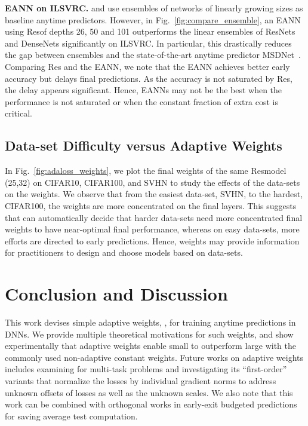 \textbf{EANN on ILSVRC.}
\cite{msdense} and \cite{feedbacknet} use ensembles of networks of linearly growing sizes as baseline anytime predictors. However, in Fig.~\ref{fig:compare_ensemble}, an EANN using Res\anns of depths 26, 50 and 101 outperforms the linear ensembles of ResNets and DenseNets significantly on ILSVRC.
In particular, this drastically reduces the gap between ensembles and the state-of-the-art anytime predictor MSDNet~\cite{msdense}. 
Comparing Res and the EANN, we note that the EANN achieves better early accuracy but delays final predictions. 
As the accuracy is not saturated by Res, the delay appears significant. Hence, EANNs may not be the best when the performance is not saturated or when the constant fraction of extra cost is critical. 


\subsection{Data-set Difficulty versus Adaptive Weights}
\label{sec:weight_vs_dataset}



In Fig.~\ref{fig:adaloss_weights}, we plot the final \adaloss weights of the same Res\ann model (25,32) on CIFAR10, CIFAR100, and SVHN to study the effects of the data-sets on the weights. We observe that from the easiest data-set, SVHN, to the hardest, CIFAR100, the weights are more concentrated on the final layers. This suggests that \adaloss can automatically decide that harder data-sets need more concentrated final weights to have near-optimal final performance, whereas on easy data-sets, more efforts are directed to early predictions. Hence, \adaloss weights may provide information for practitioners to design and choose models based on data-sets.

\section{Conclusion and Discussion}
This work devises simple adaptive weights, \adaloss, for training anytime predictions in DNNs. We provide multiple theoretical motivations for such weights, and show experimentally that adaptive weights enable small \anns to outperform large \anns with the commonly used non-adaptive constant weights. Future works on adaptive weights includes examining \adaloss for multi-task problems and investigating its ``first-order'' variants that normalize the losses by individual gradient norms to address unknown offsets of losses as well as the unknown scales. We also note that this work can be combined with orthogonal works in early-exit budgeted predictions~\cite{cascade_nn,adaptivenn} for saving average test computation. 



